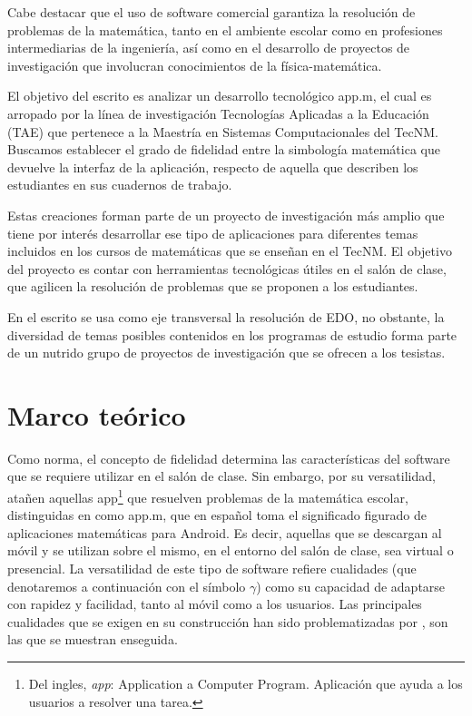 \documentclass[spanish]{textolivre}
\begin{document}
Cabe destacar que el uso de software comercial garantiza la resolución de problemas de la matemática, tanto en el ambiente escolar como en profesiones intermediarias de la ingeniería, así como en el desarrollo de proyectos de investigación que involucran conocimientos de la física-matemática.

El objetivo del escrito es analizar un desarrollo tecnológico app.m, el cual es arropado por la línea de investigación Tecnologías Aplicadas a la Educación (TAE) que pertenece a la Maestría en Sistemas Computacionales del TecNM. Buscamos establecer el grado de fidelidad entre la simbología matemática que devuelve la interfaz de la aplicación, respecto de aquella que describen los estudiantes en sus cuadernos de trabajo.

Estas creaciones forman parte de un proyecto de investigación más amplio que tiene por interés desarrollar ese tipo de aplicaciones para diferentes temas incluidos en los cursos de matemáticas que se enseñan en el TecNM. El objetivo del proyecto es contar con herramientas tecnológicas útiles en el salón de clase, que agilicen la resolución de problemas que se proponen a los estudiantes.

En el escrito se usa como eje transversal la resolución de EDO, no obstante, la diversidad de temas posibles contenidos en los programas de estudio forma parte de un nutrido grupo de proyectos de investigación que se ofrecen a los tesistas.

\section{Marco teórico}
Como norma, el concepto de fidelidad determina las características del software que se requiere utilizar en el salón de clase. Sin embargo, por su versatilidad, atañen aquellas app\footnote{Del ingles, \emph{app}: Application a Computer Program. Aplicación que ayuda a los usuarios a resolver una tarea.} que resuelven problemas de la matemática escolar, distinguidas en \textcite{camachorios2019} como app.m, que en español toma el significado figurado de aplicaciones matemáticas para Android. Es decir, aquellas que se descargan al móvil y se utilizan sobre el mismo, en el entorno del salón de clase, sea virtual o presencial. La versatilidad de este tipo de software refiere cualidades (que denotaremos a continuación con el símbolo $\gamma$) como su capacidad de adaptarse con rapidez y facilidad, tanto al móvil como a los usuarios. Las principales cualidades que se exigen en su construcción han sido problematizadas por \textcite{garcia2020}, son las que se muestran enseguida.
\end{document}
